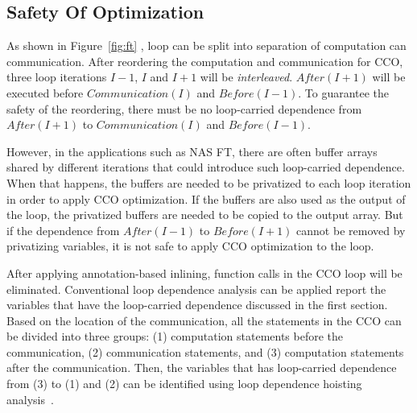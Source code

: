 \subsection{Safety Of Optimization}
\label{sec:cco:safety}



As shown in Figure~\ref{fig:ft} , loop can be split into separation of
computation can communication.  After reordering the computation and
communication for CCO, three loop iterations $I-1$, $I$ and $I+1$ will
be \emph{interleaved}.  $After(I+1)$ will be executed before
$Communication(I)$ and $Before(I-1)$.  To guarantee the safety of the
reordering, there must be no loop-carried dependence from $After(I+1)$
to $Communication(I)$ and $Before(I-1)$.

However, in the applications such as NAS FT, there are often buffer
arrays shared by different iterations that could introduce such
loop-carried dependence.  When that happens, the buffers are needed to
be privatized to each loop iteration in order to apply CCO
optimization.  If the buffers are also used as the output of the loop,
the privatized buffers are needed to be copied to the output array.
But if the dependence from $After(I-1)$ to $Before(I+1)$ cannot be
removed by privatizing variables, it is not safe to apply CCO
optimization to the loop.

After applying annotation-based inlining, function calls in the CCO
loop will be eliminated.  Conventional loop dependence analysis can be
applied report the variables that have the loop-carried dependence
discussed in the first section.  Based on the location of the
communication, all the statements in the CCO can be divided into three
groups: (1) computation statements before the communication, (2)
communication statements, and (3) computation statements after the
communication.  Then, the variables that has loop-carried dependence
from (3) to (1) and (2) can be identified using loop dependence
hoisting analysis~\cite{YKA:JSC04}.

